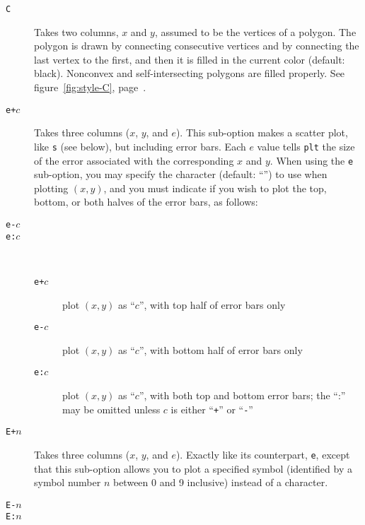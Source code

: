 \documentclass{book}
\begin{document}
\begin{description}
\item[{\tt C}]
%
%
Takes two columns, $x$ and $y$, assumed to be the vertices of a polygon.
The polygon is drawn by connecting consecutive vertices and by
connecting the last vertex to the first, and then it is filled in the
current color (default: black).  Nonconvex and self-intersecting
polygons are filled properly.
See figure~\ref{fig:style-C}, page~\pageref{fig:style-C}.

\item[{\tt e+$c$}]
%
Takes three columns ($x$, $y$, and $e$).  This sub-option
makes a scatter plot, like {\tt s} (see below), but including error bars.  Each
$e$ value tells {\tt plt} the size of the error associated with the
corresponding $x$ and $y$.  When using the {\tt e} sub-option, you may specify
the character (default: ``{\tt *}'') to use when plotting $(x,y)$, and you must
indicate if you wish to plot the top, bottom, or both halves of the error bars,
as follows:
\item[{\tt e-$c$}]
\vspace{-24.5mm}
\item[{\tt e:$c$}]
\vspace{-3.5mm}
~
\begin{description}
\item[{\tt e+$c$}]
\vspace{13mm}
plot $(x,y)$ as ``$c$'', with top half of error bars only
\item[{\tt e-$c$}]
plot $(x,y)$ as ``$c$'', with bottom half of error bars only
\item[{\tt e:$c$}]
plot $(x,y)$ as ``$c$'', with both top and bottom error bars;
the ``:'' may be omitted unless $c$ is either ``{\tt +}'' or
``{\tt -}''
\end{description}

\item[{\tt E+$n$}]
%
Takes three columns ($x$, $y$, and $e$).
Exactly like its counterpart, {\tt e}, except that this sub-option
allows you to plot a specified symbol (identified by a symbol number $n$
between 0 and 9 inclusive) instead of a character.
\item[{\tt E-$n$}]
\vspace{-12mm}
\item[{\tt E:$n$}]
\vspace{-3.5mm}
~


\end{description}
\end{document}

